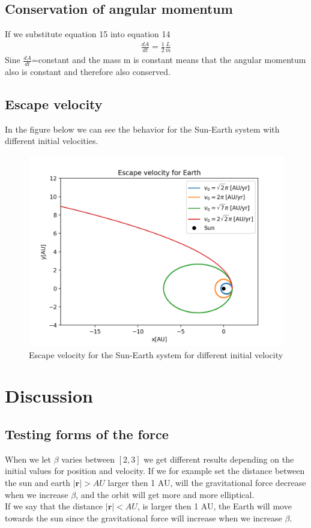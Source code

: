 \documentclass{article}
\begin{document}
\begin{multicols}{2}
\subsection{Conservation of angular momentum}
If we substitute equation 15 into equation 14 
\begin{align}
    \frac{dA}{dt}=\frac{1}{2}\frac{L}{m}
\end{align}
Sine $\frac{dA}{dt}$=constant and the mass m is constant means that the angular momentum also is constant and therefore also conserved.  
\\
\subsection{Escape velocity}
In the figure below we can see the behavior for the Sun-Earth system with different initial velocities. 
\begin{figure}[H]
	\centering
	\includegraphics[width=\linewidth]{esc_vel_plot.png}
	\caption{Escape velocity for the Sun-Earth system for different initial velocity}
	\label{fig:1bplot}
\end{figure}
\section{Discussion}
\subsection{Testing forms of the force}
When we let $\beta$ varies between $[2,3]$ we get different results depending on the initial values for position and velocity. If we for example set the distance between the sun and earth $|\mathbf{r}|>AU$ larger then 1 AU, will the gravitational force decrease when we increase $\beta$, and the orbit will get more and more elliptical. \\
If we say that the distance $|\mathbf{r}|<AU$, is larger then 1 AU, the Earth will move towards the sun since the gravitational force will increase when we increase $\beta$.    

\end{multicols}
\end{document}
